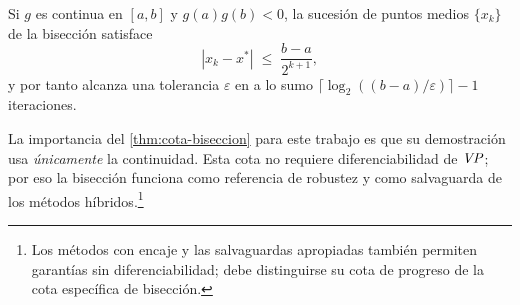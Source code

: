 \begin{theorem}
\label{thm:cota-biseccion}
Si $g$ es continua en $[a,b]$ y $g(a)g(b)<0$, la sucesión de puntos medios
$\{x_k\}$ de la bisección satisface
\[
  |x_k-x^*|\;\le\;\frac{b-a}{2^{k+1}},
\]
y por tanto alcanza una tolerancia $\varepsilon$ en a lo sumo
$\lceil\log_2((b-a)/\varepsilon)\rceil-1$ iteraciones.
\end{theorem}

La importancia del \cref{thm:cota-biseccion} para este trabajo es que su
demostración usa \emph{únicamente} la continuidad. Esta cota no requiere diferenciabilidad de $\mathit{VP}$; por eso la bisección
funciona como referencia de robustez y como salvaguarda de los métodos híbridos.\footnote{Los métodos con encaje y las salvaguardas apropiadas también permiten garantías sin diferenciabilidad; debe distinguirse su cota de progreso de la cota específica de bisección.}
